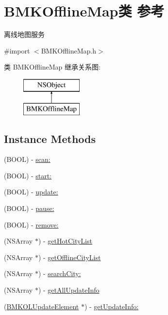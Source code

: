 \hypertarget{interface_b_m_k_offline_map}{\section{B\+M\+K\+Offline\+Map类 参考}
\label{interface_b_m_k_offline_map}
}


离线地图服务  




{\ttfamily \#import $<$B\+M\+K\+Offline\+Map.\+h$>$}

类 B\+M\+K\+Offline\+Map 继承关系图\+:\begin{figure}[H]
\begin{center}
\leavevmode
\includegraphics[height=2.000000cm]{interface_b_m_k_offline_map}
\end{center}
\end{figure}
\subsection*{Instance Methods}
\begin{DoxyCompactItemize}
\item 
(B\+O\+O\+L) -\/ \hyperlink{interface_b_m_k_offline_map_a2074d1fd832b6e5c84ab6b1c438a3b1f}{scan\+:}
\item 
(B\+O\+O\+L) -\/ \hyperlink{interface_b_m_k_offline_map_a40aa794e96677e472bf0d6f2ac18d583}{start\+:}
\item 
(B\+O\+O\+L) -\/ \hyperlink{interface_b_m_k_offline_map_a4c2489e1502d34bd807a1c4418560f88}{update\+:}
\item 
(B\+O\+O\+L) -\/ \hyperlink{interface_b_m_k_offline_map_a9c601d81b148c729342863db92b47831}{pause\+:}
\item 
(B\+O\+O\+L) -\/ \hyperlink{interface_b_m_k_offline_map_ac834ae7e577d2fa4dc864232b30f02df}{remove\+:}
\item 
(N\+S\+Array $\ast$) -\/ \hyperlink{interface_b_m_k_offline_map_a35c1c36472716ec22cacd54c5c710a5e}{get\+Hot\+City\+List}
\item 
(N\+S\+Array $\ast$) -\/ \hyperlink{interface_b_m_k_offline_map_a9a78b1a176ea59abe1b26e237a6e3a2c}{get\+Offline\+City\+List}
\item 
(N\+S\+Array $\ast$) -\/ \hyperlink{interface_b_m_k_offline_map_a9447d5aed62366152b3b6978b9fc1d34}{search\+City\+:}
\item 
(N\+S\+Array $\ast$) -\/ \hyperlink{interface_b_m_k_offline_map_a3152e5d5076958cda782d20565ceea56}{get\+All\+Update\+Info}
\item 
(\hyperlink{interface_b_m_k_o_l_update_element}{B\+M\+K\+O\+L\+Update\+Element} $\ast$) -\/ \hyperlink{interface_b_m_k_offline_map_ab11a98584ffd1f5582a2439a794646cb}{get\+Update\+Info\+:}
\end{DoxyCompactItemize}
